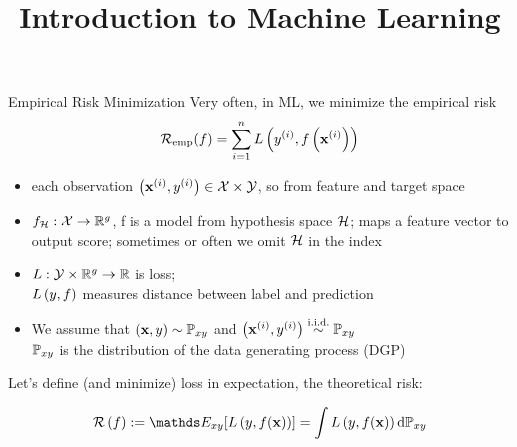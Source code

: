 \documentclass[11pt,compress,t,notes=noshow, xcolor=table]{beamer}
\title{Introduction to Machine Learning}
\begin{document}
    

\begin{vbframe}{Empirical Risk Minimization}
Very often, in ML, we minimize the empirical risk
\vspace{-0.3cm}
$$\mathcal{R}_{\text{emp}}(f) = \sum\limits_{i=1}^n L\left(y^{(i)}, f\left(\mathbf{x}^{(i)}\right)\right)$$
\vspace{-0.2cm}
{\small
\begin{itemize}\setlength\itemsep{0.5pt} 
    \item each observation $\left(\mathbf{x}^{(i)}, y^{(i)}\right) \in  \mathcal{X} \times \mathcal{Y}$,
    so from feature and target space
    \item $f_{\mathcal{H}}:\mathcal{X} \rightarrow \mathbb{R}^g$, 
    f is a model from hypothesis space $\mathcal{H}$;
    maps a feature vector to output score;
    sometimes or often we omit $\mathcal{H}$ in the index 
    \item $L:\mathcal{Y}\times\mathbb{R}^g\rightarrow\mathbb{R}$ is loss;\\
    $L\left(y, f\right)$ measures distance between label and prediction
    \item We assume that $(\mathbf{x},y) \sim \mathbb{P}_{xy}$ and $\left(\mathbf{x}^{(i)}, y^{(i)}\right)  \overset{\text{i.i.d.}}{\sim} \mathbb{P}_{xy}$ \\
    $\mathbb{P}_{xy}$ is the distribution of the data generating process (DGP)
\end{itemize}
}
Let's define (and minimize) loss in expectation, the theoretical risk:

$$ \risk \left(f\right) := \E_{xy} [\Lxy] = \int \Lxy \text{d}\Pxy $$
\end{vbframe}
\end{document}
